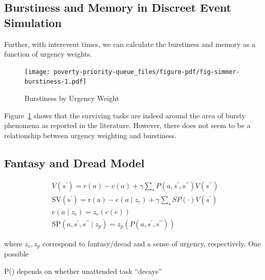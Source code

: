 \documentclass[
]{article}
\begin{document}
\hypertarget{burstiness-and-memory-in-discreet-event-simulation}{%
\subsection{Burstiness and Memory in Discreet Event
Simulation}\label{burstiness-and-memory-in-discreet-event-simulation}}

Further, with interevent times, we can calculate the burstiness and
memory as a function of urgency weights.

\begin{figure}

{\centering \texttt{[image: poverty-priority-queue\_files/figure-pdf/fig-simmer-burstiness-1.pdf]}

}

\caption{\label{fig-simmer-burstiness}Burstiness by Urgency Weight}

\end{figure}

Figure~\ref{fig-simmer-burstiness} shows that the surviving tasks are
indeed around the area of bursty phenomena as reported in the
literature. However, there does not seem to be a relationship between
urgency weighting and burstiness.

\hypertarget{fantasy-and-dread-model}{%
\subsection{Fantasy and Dread Model}\label{fantasy-and-dread-model}}

\[
\begin{aligned}
& V\left(s^{\prime}\right)=r(a)-c(a)+\gamma \sum_s P\left(a, s^{\prime}, s^{\prime \prime}\right) V\left(s^{\prime \prime}\right) \\
& \mathrm{SV}\left(\mathrm{s}^{\prime}\right)=\mathrm{r}(\mathrm{a})-e\left(a \mid z_e\right)+\gamma \sum_s S P(\cdot) V\left(s^{\prime}\right) \\
& e\left(a \mid z_e\right)=z_e(c(e)) \\
& \mathrm{SP}\left(a, s^{\prime}, s^{\prime \prime} \mid z_p\right)=z_p\left(P\left(a, s^{\prime}, s^{\prime \prime}\right)\right)
\end{aligned}
\]

where \(z_e, z_p\) correspond to fantasy/dread and a sense of urgency,
respectively. One possible

P() depends on whether unattended task ``decays''
\end{document}
